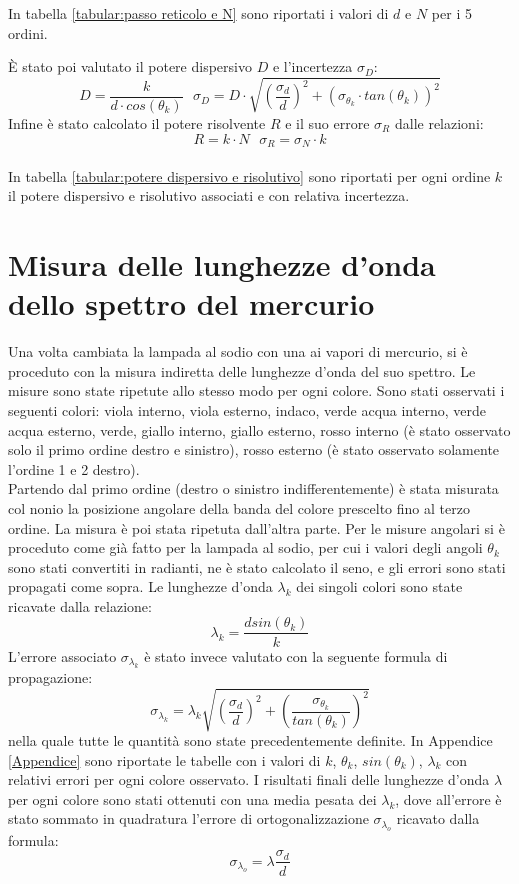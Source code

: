 \documentclass{article}
\begin{document}
        In tabella \ref{tabular:passo reticolo e N} sono riportati i valori di $d$ e $N$ per i 5 ordini. 

  
        È stato poi valutato il potere dispersivo $D$ e l'incertezza $\sigma_D$: 
        \[D = \frac{k}{d \cdot cos(\theta_k)} \ \ \ \sigma_D = D \cdot \sqrt{(\frac{\sigma_d}{d})^2 + (\sigma_{\theta_k} \cdot tan(\theta_k))^2}\]
        Infine è stato calcolato il potere risolvente $R$ e il suo errore $\sigma_R$ dalle relazioni: \[R = k \cdot N \ \ \ \sigma_R = \sigma_N \cdot k\] \\ 
        
        In tabella \ref{tabular:potere dispersivo e risolutivo} sono riportati per ogni ordine $k$ il potere dispersivo e risolutivo associati e con relativa incertezza. 
        

        

    \section{Misura delle lunghezze d'onda dello spettro del mercurio}

        Una volta cambiata la lampada al sodio con una ai vapori di mercurio, si è proceduto con la misura indiretta delle lunghezze d'onda del suo spettro.
        Le misure sono state ripetute allo stesso modo per ogni colore. Sono stati osservati i seguenti colori: viola interno, viola esterno, indaco, 
        verde acqua interno, verde acqua esterno, verde, giallo interno, giallo esterno, rosso interno (è stato osservato solo il primo ordine destro e sinistro), 
        rosso esterno (è stato osservato solamente l'ordine 1 e 2 destro). \\
        Partendo dal primo ordine (destro o sinistro indifferentemente) è stata misurata col nonio la posizione angolare della banda del colore prescelto
        fino al terzo ordine. La misura è poi stata ripetuta dall'altra parte. Per le misure angolari si è proceduto come già fatto per la lampada al sodio,
        per cui i valori degli angoli $\theta_k$ sono stati convertiti in radianti, ne è stato calcolato il seno, e gli errori sono stati propagati come sopra.
        Le lunghezze d'onda $\lambda_k$ dei singoli colori sono state ricavate dalla relazione: \[\lambda_k = \frac{d sin(\theta_k)}{k}\]
        L'errore associato $\sigma_{\lambda_k}$ è stato invece valutato con la seguente formula di propagazione:
        \[\sigma_{\lambda_k} = \lambda_k \sqrt{(\frac{\sigma_d}{d})^2 + (\frac{\sigma_{\theta_k}}{tan(\theta_k)})^2}\]
        nella quale tutte le quantità sono state precedentemente definite. 
        In Appendice \ref{Appendice} sono riportate le tabelle con i valori di $k$, $\theta_k$, $sin(\theta_k)$, $\lambda_k$ con relativi errori per ogni colore osservato. 
        I risultati finali delle lunghezze d'onda $\lambda$ per ogni colore sono stati ottenuti con una media pesata dei $\lambda_k$, 
        dove all'errore è stato sommato in quadratura l'errore di ortogonalizzazione $\sigma_{\lambda_o}$ ricavato dalla formula:
        \[\sigma_{\lambda_o} = \lambda \frac{\sigma_d}{d} \]
        
\end{document}
